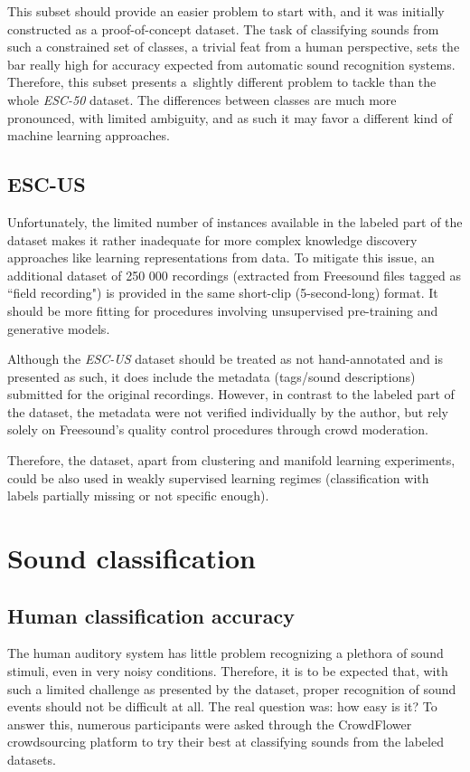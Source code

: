 \documentclass[letterpaper]{sig-alternate}
\begin{document}
This subset should provide an easier problem to start with, and it was initially constructed as a proof-of-concept dataset. The task of classifying sounds from such a constrained set of classes, a trivial feat from a human perspective, sets the bar really high for accuracy expected from automatic sound recognition systems. Therefore, this subset presents a~slightly different problem to tackle than the whole \textit{ESC-50} dataset. The differences between classes are much more pronounced, with limited ambiguity, and as such it may favor a different kind of machine learning approaches.

\subsection{ESC-US}

Unfortunately, the limited number of instances available in the labeled part of the dataset makes it rather inadequate for more complex knowledge discovery approaches like learning representations from data. To mitigate this issue, an additional dataset of 250 000 recordings (extracted from Freesound files tagged as ``field recording") is provided in the same short-clip (5-second-long) format. It should be more fitting for procedures involving unsupervised pre-training and generative models.

Although the \textit{ESC-US} dataset should be treated as not hand-annotated and is presented as such, it does include the metadata (tags/sound descriptions) submitted for the original recordings. However, in contrast to the labeled part of the dataset, the metadata were not verified individually by the author, but rely solely on Freesound's quality control procedures through crowd moderation.

Therefore, the dataset, apart from clustering and manifold learning experiments, could be also used in weakly supervised learning regimes (classification with labels partially missing or not specific enough).

\section{Sound classification}

\subsection{Human classification accuracy}

The human auditory system has little problem recognizing a plethora of sound stimuli, even in very noisy conditions. Therefore, it is to be expected that, with such a limited challenge as presented by the dataset, proper recognition of sound events should not be difficult at all. The real question was: how easy is it? To answer this, numerous participants were asked through the CrowdFlower crowdsourcing platform to try their best at classifying sounds from the labeled datasets.
\end{document}
